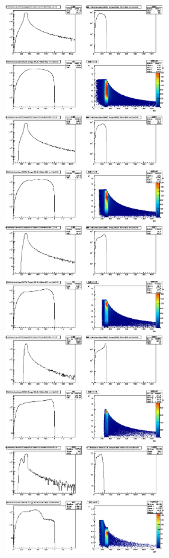 \documentclass{fheadnote}
\begin{document}
\begin{figure}[htbp]
   \centering
   \includegraphics[width=7cm]{Figures/MRToy14_NoCut}
   \includegraphics[width=7cm]{Figures/MRToy14_ToEndcap}\\
   \includegraphics[width=7cm]{Figures/MRToy14_ToBarrel}
   \includegraphics[width=7cm]{Figures/MRToy14_Central}\\
   \includegraphics[width=7cm]{Figures/MRToy14_HalfBarrel}

\end{figure}
\end{document}
